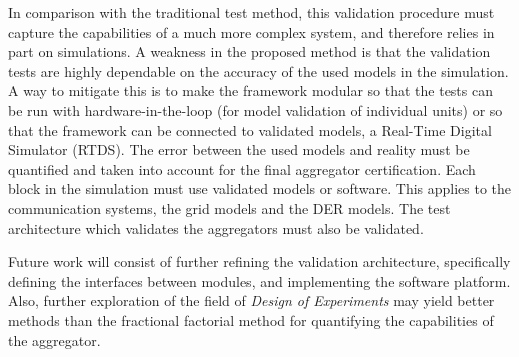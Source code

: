 In comparison with the traditional test method, this validation procedure must capture the capabilities of a much more complex system, and therefore relies in part on simulations. A weakness in the proposed method is that the validation tests are highly dependable on the accuracy of the used models in the simulation. A way to mitigate this is to make the framework modular so that the tests can be run with hardware-in-the-loop (for model validation of individual units) or so that the framework can be connected to validated models, \eg a Real-Time Digital Simulator (RTDS). The error between the used models and reality must be quantified and taken into account for the final aggregator certification. Each block in the simulation must use validated models or software. This applies to the communication systems, the grid models and the DER models. The test architecture which validates the aggregators must also be validated.

Future work will consist of further refining the validation architecture, specifically defining the interfaces between modules, and implementing the software platform. Also, further exploration of the field of \emph{Design of Experiments} may yield better methods than the fractional factorial method for quantifying the capabilities of the aggregator.

